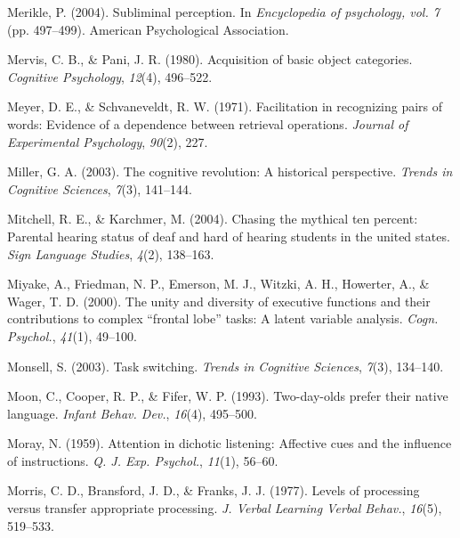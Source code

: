 \documentclass[
]{krantz}
\newlength{\cslhangindent}
\newlength{\cslentryspacingunit} %
\newenvironment{CSLReferences}[2] %
 {%
  \setlength{\parindent}{0pt}
  \ifodd #1
  \let\oldpar\par
  \def\par{\hangindent=\cslhangindent\oldpar}
  \fi
  \setlength{\parskip}{#2\cslentryspacingunit}
 }%
 {}
\begin{document}
\begin{CSLReferences}{1}{0}
\leavevmode{}%
Merikle, P. (2004). Subliminal perception. In \emph{Encyclopedia of psychology, vol. 7} (pp. 497--499). American Psychological Association.

\leavevmode{}%
Mervis, C. B., \& Pani, J. R. (1980). Acquisition of basic object categories. \emph{Cognitive Psychology}, \emph{12}(4), 496--522.

\leavevmode{}%
Meyer, D. E., \& Schvaneveldt, R. W. (1971). Facilitation in recognizing pairs of words: Evidence of a dependence between retrieval operations. \emph{Journal of Experimental Psychology}, \emph{90}(2), 227.

\leavevmode{}%
Miller, G. A. (2003). The cognitive revolution: A historical perspective. \emph{Trends in Cognitive Sciences}, \emph{7}(3), 141--144.

\leavevmode{}%
Mitchell, R. E., \& Karchmer, M. (2004). Chasing the mythical ten percent: Parental hearing status of deaf and hard of hearing students in the united states. \emph{Sign Language Studies}, \emph{4}(2), 138--163.

\leavevmode{}%
Miyake, A., Friedman, N. P., Emerson, M. J., Witzki, A. H., Howerter, A., \& Wager, T. D. (2000). The unity and diversity of executive functions and their contributions to complex {``frontal lobe''} tasks: A latent variable analysis. \emph{Cogn. Psychol.}, \emph{41}(1), 49--100.

\leavevmode{}%
Monsell, S. (2003). Task switching. \emph{Trends in Cognitive Sciences}, \emph{7}(3), 134--140.

\leavevmode{}%
Moon, C., Cooper, R. P., \& Fifer, W. P. (1993). Two-day-olds prefer their native language. \emph{Infant Behav. Dev.}, \emph{16}(4), 495--500.

\leavevmode{}%
Moray, N. (1959). Attention in dichotic listening: Affective cues and the influence of instructions. \emph{Q. J. Exp. Psychol.}, \emph{11}(1), 56--60.

\leavevmode{}%
Morris, C. D., Bransford, J. D., \& Franks, J. J. (1977). Levels of processing versus transfer appropriate processing. \emph{J. Verbal Learning Verbal Behav.}, \emph{16}(5), 519--533.


\end{CSLReferences}
\end{document}
